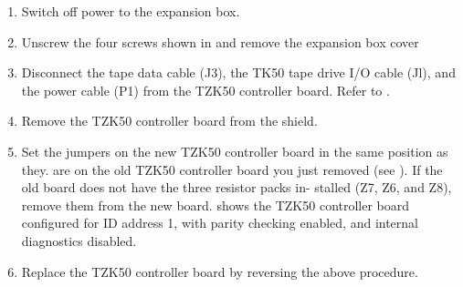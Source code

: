 \begin{enumerate}
\item	 Switch off power to the expansion box.

\item	Unscrew the four screws shown in  and remove the expansion box cover

\newpage

\item	Disconnect the tape data cable (J3), the TK50 tape drive I/O cable (Jl),
		and the power cable (P1) from the TZK50 controller board. Refer to .


\item	Remove the TZK50 controller board from the shield.
\item	Set the jumpers on the new TZK50 controller board in the same position
		as they. are on the old TZK50 controller board you just removed (see
		). If the old board does not have the three resistor packs in-
		stalled (Z7, Z6, and Z8), remove them from the new board. 
		shows the TZK50 controller board configured for ID address 1, with
		parity checking enabled, and internal diagnostics disabled.
\item	Replace the TZK50 controller board by reversing the above procedure.
\end{enumerate}
\newpage

\newpage

